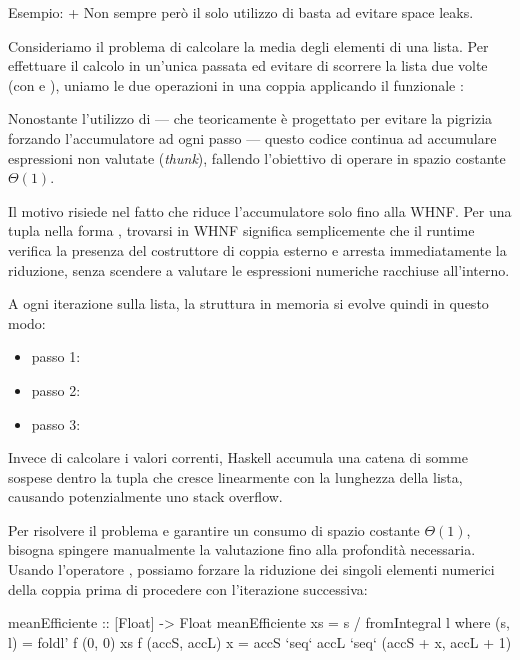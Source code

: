\begin{gframe}{Esempio:  + }
Non sempre però il solo utilizzo di  basta ad evitare space leaks.

Consideriamo il problema di calcolare la media degli elementi di una lista. Per effettuare il calcolo in un'unica passata ed evitare di scorrere la lista due volte (con  e ), uniamo le due operazioni in una coppia applicando il funzionale :


Nonostante l'utilizzo di  — che teoricamente è progettato per evitare la pigrizia forzando l'accumulatore ad ogni passo — questo codice continua ad accumulare espressioni non valutate (\emph{thunk}), fallendo l'obiettivo di operare in spazio costante $\Theta(1)$.

Il motivo risiede nel fatto che  riduce l'accumulatore solo fino alla WHNF. Per una tupla nella forma , trovarsi in WHNF significa semplicemente che il runtime verifica la presenza del costruttore di coppia esterno \code{(,)} e arresta immediatamente la riduzione, senza scendere a valutare le espressioni numeriche racchiuse all'interno.

A ogni iterazione sulla lista, la struttura in memoria si evolve quindi in questo modo:
\begin{itemize}
    \item passo 1: 
    \item passo 2: 
    \item passo 3: 
\end{itemize}
Invece di calcolare i valori correnti, Haskell accumula una catena di somme sospese dentro la tupla che cresce linearmente con la lunghezza della lista, causando potenzialmente uno stack overflow.

Per risolvere il problema e garantire un consumo di spazio costante $\Theta(1)$, bisogna spingere manualmente la valutazione fino alla profondità necessaria. Usando l'operatore , possiamo forzare la riduzione dei singoli elementi numerici della coppia prima di procedere con l'iterazione successiva:

\begin{haskellbox}{}
meanEfficiente :: [Float] -> Float
meanEfficiente xs = s / fromIntegral l
  where
    (s, l) = foldl' f (0, 0) xs
    f (accS, accL) x = accS `seq` accL `seq` (accS + x, accL + 1)
\end{haskellbox}
\end{gframe}


